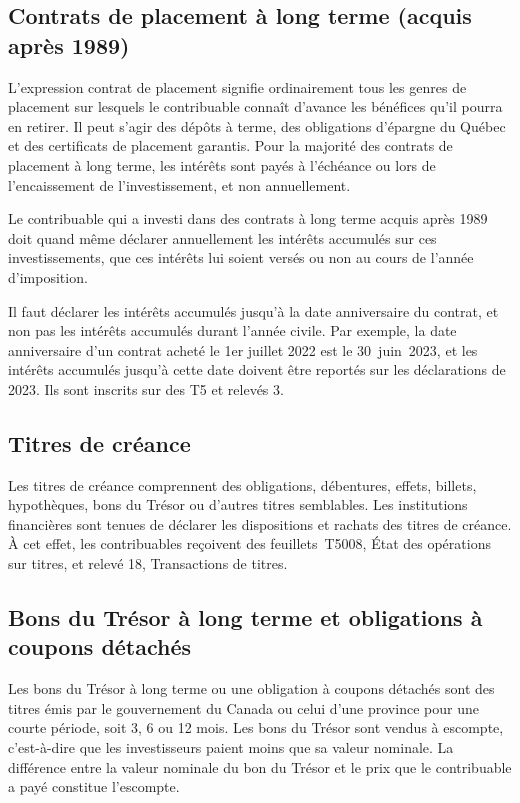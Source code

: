 \subsection{Contrats de placement à long terme (acquis après 1989)}
L'expression \og contrat de placement \fg{} signifie ordinairement tous les genres de placement sur lesquels le contribuable connaît d'avance les bénéfices qu'il pourra en retirer. Il peut s'agir des dépôts à terme, des obligations d'épargne du Québec et des certificats de placement garantis. Pour la majorité des contrats de placement à long terme, les intérêts sont payés à l'échéance ou lors de l'encaissement de l'investissement, et non annuellement.

Le contribuable qui a investi dans des contrats à long terme acquis après 1989 doit quand même déclarer annuellement les intérêts accumulés sur ces investissements, que ces intérêts lui soient versés ou non au cours de l'année d'imposition. 

Il faut déclarer les intérêts accumulés jusqu'à la date anniversaire du contrat, et non pas les intérêts accumulés durant l'année civile. Par exemple, la date anniversaire d'un contrat acheté le 1er juillet 2022 est le 30~juin~2023, et les intérêts accumulés jusqu'à cette date doivent être reportés sur les déclarations de 2023. Ils sont inscrits sur des T5 et relevés 3.


\subsection{Titres de créance}
Les \og titres de créance \fg{} comprennent des obligations, débentures, effets, billets, hypothèques, bons du Trésor ou d'autres titres semblables. Les institutions financières sont tenues de déclarer les dispositions et rachats des titres de créance. À cet effet, les contribuables reçoivent des feuillets~T5008, État des opérations sur titres, et relevé 18, Transactions de titres.


\subsection{Bons du Trésor à long terme et obligations à coupons détachés}
Les bons du Trésor à long terme ou une obligation à coupons détachés sont des titres émis par le gouvernement du Canada ou celui d'une province pour une courte période, soit 3, 6 ou 12 mois. Les bons du Trésor sont vendus à escompte, c'est-à-dire que les investisseurs paient moins que sa valeur nominale. La différence entre la valeur nominale du bon du Trésor et le prix que le contribuable a payé constitue l'escompte.

